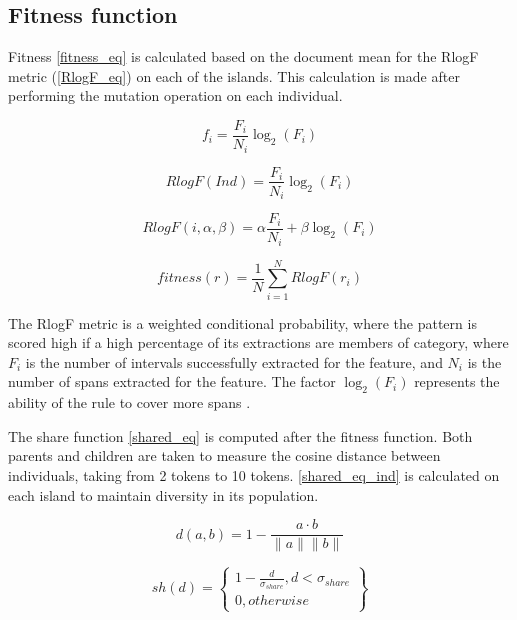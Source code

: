 \documentclass{IEEEtran}
\begin{document}
\subsection{Fitness function}

Fitness \ref{fitness_eq} is calculated based on the document mean for the RlogF metric (\ref*{RlogF_eq})\cite{seman_lex} on each of the islands. This calculation is made after performing the mutation operation on each individual.

\begin{equation}
  \label{RlogF_eq}
  f_i = \frac{F_i}{N_i} {\log_2}({F_i})
\end{equation}

\begin{equation}
  \label{RlogF_eq}
  RlogF(Ind) = \frac{F_i}{N_i} {\log_2}({F_i})
\end{equation}

\begin{equation}
  \label{RlogF_eq2}
  RlogF(i,\alpha,\beta) = \alpha\frac{F_i}{N_i} + \beta{\log_2}({F_i})
\end{equation}

\begin{equation}
  \label{fitness_eq}
  fitness(r) = \frac{1}{N} \sum_{i=1}^{N} RlogF(r_i)
\end{equation}

The RlogF metric is a weighted conditional probability, where the pattern is scored high if a high percentage of its extractions are members of category\cite{seman_lex}, where ${F_i}$ is the number of intervals successfully extracted for the feature,
and ${ N_i}$ is the number of spans extracted for the feature. The factor ${\log_2}({F_i})$ represents the ability of the rule to cover more spans \cite{tallor}.

The share function \ref{shared_eq} is computed after the fitness function. Both parents and children are taken to measure the cosine distance between individuals, taking from 2 tokens to 10 tokens. \ref{shared_eq_ind} is calculated on each island to maintain diversity in its population.

\begin{equation}
  \label{cosine_distance}
  d(a, b) = 1- \frac{a \cdot b}{\|a\| \|b\|}
\end{equation}


\begin{equation}
  \label{shared_eq}
  sh(d) = \left \{
  \begin{array}{l}
    1  - \frac{d}{\sigma_{share}}, d < {\sigma_{share}} \\
    0, otherwise
  \end{array}
  \right \}
\end{equation}
\end{document}
